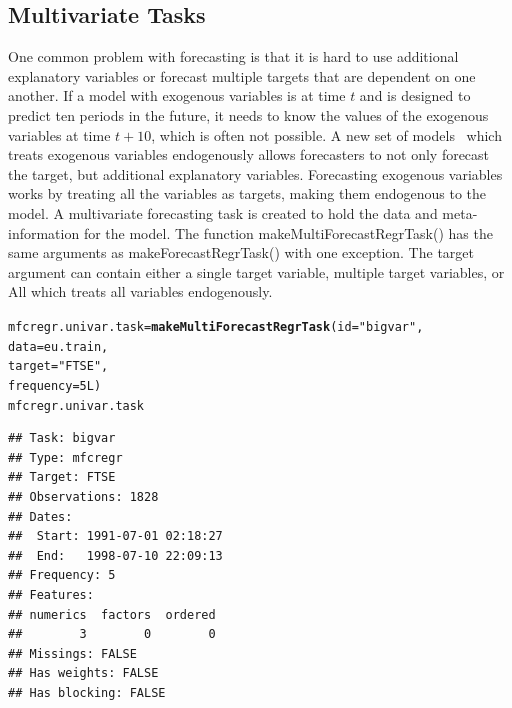 \documentclass[12pt]{article}\usepackage[]{graphicx}\usepackage[]{color}
\makeatletter
\newcommand{\hlnum}[1]{\textcolor[rgb]{0.686,0.059,0.569}{#1}}%
\newcommand{\hlstr}[1]{\textcolor[rgb]{0.192,0.494,0.8}{#1}}%
\newcommand{\hlstd}[1]{\textcolor[rgb]{0.345,0.345,0.345}{#1}}%
\newcommand{\hlkwb}[1]{\textcolor[rgb]{0.69,0.353,0.396}{#1}}%
\newcommand{\hlkwc}[1]{\textcolor[rgb]{0.333,0.667,0.333}{#1}}%
\newcommand{\hlkwd}[1]{\textcolor[rgb]{0.737,0.353,0.396}{\textbf{#1}}}%
\newenvironment{kframe}{%
 \def\at@end@of@kframe{}%
 \ifinner\ifhmode%
  \def\at@end@of@kframe{\end{minipage}}%
  \begin{minipage}{\columnwidth}%
 \fi\fi%
 \def\FrameCommand##1{\hskip\@totalleftmargin \hskip-\fboxsep
 \colorbox{shadecolor}{##1}\hskip-\fboxsep
     \hskip-\linewidth \hskip-\@totalleftmargin \hskip\columnwidth}%
 \MakeFramed {\advance\hsize-\width
   \@totalleftmargin\z@ \linewidth\hsize
   \@setminipage}}%
 {\par\unskip\endMakeFramed%
 \at@end@of@kframe}
\newenvironment{knitrout}{}{} %
\theoremstyle{definition}
\newcommand\code{\@codex}
\def\@codex#1{{\normalfont\ttfamily\hyphenchar\font=-1 #1}}
\makeatother
\begin{document}
\subsection{Multivariate Tasks}
\label{sec:multivarTask}

One common problem with forecasting is that it is hard to use additional explanatory variables or forecast multiple targets that are dependent on one another. If a model with exogenous variables is at time $t$ and is designed to predict ten periods in the future, it needs to know the values of the exogenous variables at time $t+10$, which is often not possible. A new set of models~\cite{BigVAR} which treats exogenous variables endogenously allows forecasters to not only forecast the target, but additional explanatory variables. Forecasting exogenous variables works by treating all the variables as targets, making them endogenous to the model. A multivariate forecasting task is created to hold the data and meta-information for the model. The function \code{makeMultiForecastRegrTask()} has the same arguments as \code{makeForecastRegrTask()} with one exception. The \code{target} argument can contain either a single target variable, multiple target variables, or \code{All} which treats all variables endogenously.

\singlespacing
\begin{knitrout}
\color{fgcolor}\begin{kframe}
\begin{alltt}
\hlstd{mfcregr.univar.task} \hlkwb{=} \hlkwd{makeMultiForecastRegrTask}\hlstd{(}\hlkwc{id} \hlstd{=} \hlstr{"bigvar"}\hlstd{,}
                                         \hlkwc{data} \hlstd{= eu.train,}
                                         \hlkwc{target} \hlstd{=} \hlstr{"FTSE"}\hlstd{,}
                                         \hlkwc{frequency} \hlstd{=} \hlnum{5L}\hlstd{)}
\hlstd{mfcregr.univar.task}
\end{alltt}
\begin{verbatim}
## Task: bigvar
## Type: mfcregr
## Target: FTSE
## Observations: 1828
## Dates:
##  Start: 1991-07-01 02:18:27 
##  End:   1998-07-10 22:09:13
## Frequency: 5
## Features:
## numerics  factors  ordered 
##        3        0        0 
## Missings: FALSE
## Has weights: FALSE
## Has blocking: FALSE
\end{verbatim}
\end{kframe}
\end{knitrout}
\doublespacing
\end{document}
